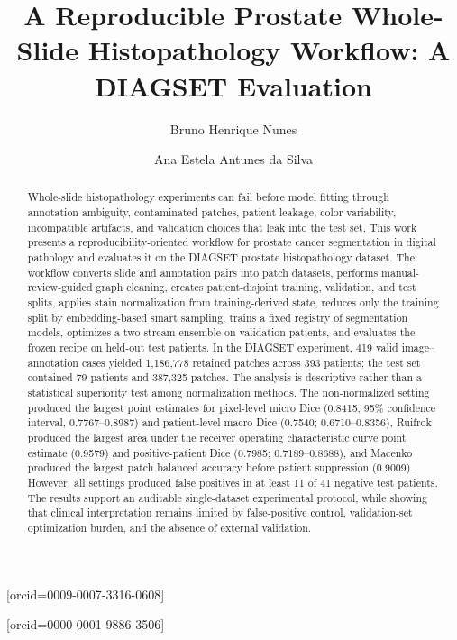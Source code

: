 \documentclass[a4paper,fleqn]{cas-dc}
\begin{document}
\let\WriteBookmarks\relax
\def\floatpagepagefraction{1}
\def\textpagefraction{.001}


\title[mode=title]{A Reproducible Prostate Whole-Slide Histopathology Workflow: A DIAGSET Evaluation}

\author[1]{Bruno Henrique Nunes}[orcid=0009-0007-3316-0608]
\cormark[1]

\author[1]{Ana Estela Antunes da Silva}[orcid=0000-0001-9886-3506]



\begin{abstract}
Whole-slide histopathology experiments can fail before model fitting through annotation ambiguity, contaminated patches, patient leakage, color variability, incompatible artifacts, and validation choices that leak into the test set. This work presents a reproducibility-oriented workflow for prostate cancer segmentation in digital pathology and evaluates it on the DIAGSET prostate histopathology dataset. The workflow converts slide and annotation pairs into patch datasets, performs manual-review-guided graph cleaning, creates patient-disjoint training, validation, and test splits, applies stain normalization from training-derived state, reduces only the training split by embedding-based smart sampling, trains a fixed registry of segmentation models, optimizes a two-stream ensemble on validation patients, and evaluates the frozen recipe on held-out test patients. In the DIAGSET experiment, 419 valid image--annotation cases yielded 1,186,778 retained patches across 393 patients; the test set contained 79 patients and 387,325 patches. The analysis is descriptive rather than a statistical superiority test among normalization methods. The non-normalized setting produced the largest point estimates for pixel-level micro Dice (0.8415; 95\% confidence interval, 0.7767--0.8987) and patient-level macro Dice (0.7540; 0.6710--0.8356), Ruifrok produced the largest area under the receiver operating characteristic curve point estimate (0.9579) and positive-patient Dice (0.7985; 0.7189--0.8688), and Macenko produced the largest patch balanced accuracy before patient suppression (0.9009). However, all settings produced false positives in at least 11 of 41 negative test patients. The results support an auditable single-dataset experimental protocol, while showing that clinical interpretation remains limited by false-positive control, validation-set optimization burden, and the absence of external validation.
\end{abstract}
\end{document}
